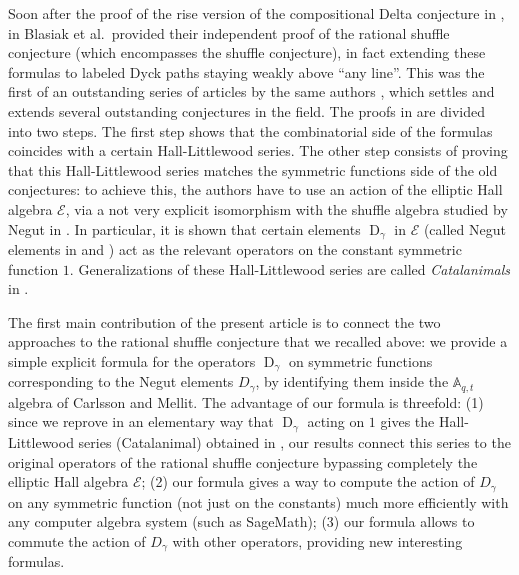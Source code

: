 \documentclass[reqno]{amsart}
\theoremstyle{plain}
\theoremstyle{definition}
\theoremstyle{remark}
\DeclareMathOperator{\D}{D}
\newcommand{\A}{\mathbb{A}}%
\newcommand{\<}{\langle}
\renewcommand{\>}{\rangle}
\begin{document}
Soon after the proof of the rise version of the compositional Delta conjecture in \cite{DAdderioMellit2022CompositionalDelta}, in \cite{BHMPS2023ShuffleAnyLine} Blasiak et al.\ provided their independent proof of the rational shuffle conjecture (which encompasses the shuffle conjecture), in fact extending these formulas to labeled Dyck paths staying weakly above ``any line''. This was the first of an outstanding series of articles by the same authors \cites{BHMPS2023ProofExtendedDelta,BHMPS2024LLT,BHMPS2025LoehrWarrington,BHMPS2025RaisingOperatorFormula}, which settles and extends several outstanding conjectures in the field. The proofs in \cite{BHMPS2023ShuffleAnyLine} are divided into two steps. The first step shows that the combinatorial side of the formulas coincides with a certain Hall-Littlewood series. The other step consists of proving that this Hall-Littlewood series matches the symmetric functions side of the old conjectures: to achieve this, the authors have to use an action of the elliptic Hall algebra $\mathcal{E}$, via a not very explicit isomorphism with the shuffle algebra studied by Negut in \cite{Negut2014ShuffleAlgebra}. In particular, it is shown that certain elements $\D_\gamma$ in $\mathcal{E}$ (called Negut elements in \cites{BHMPS2023ShuffleAnyLine,BHMPS2023ProofExtendedDelta} and \cite{BenDaliBonzomDoulega2026PathOperators}) act as the relevant operators on the constant symmetric function $1$. Generalizations of these Hall-Littlewood series are called \emph{Catalanimals} in \cites{BHMPS2024LLT,BHMPS2025LoehrWarrington,BHMPS2025RaisingOperatorFormula}.

The first main contribution of the present article is to connect the two approaches to the rational shuffle conjecture that we recalled above: we provide a simple explicit formula for the operators $\D_\gamma$ on symmetric functions corresponding to the Negut elements $D_\gamma$, by identifying them inside the $\A_{q,t}$ algebra of Carlsson and Mellit. The advantage of our formula is threefold: (1) since we reprove in an elementary way that $\D_\gamma$ acting on $1$ gives the Hall-Littlewood series (Catalanimal) obtained in \cite{BHMPS2023ShuffleAnyLine}, our results connect this series to the original operators of the rational shuffle conjecture bypassing completely the elliptic Hall algebra $\mathcal{E}$; (2) our formula gives a way to compute the action of $D_\gamma$ on any symmetric function (not just on the constants) much more efficiently with any computer algebra system (such as SageMath); (3) our formula allows to commute the action of $D_\gamma$ with other operators, providing new interesting formulas.
\end{document}
